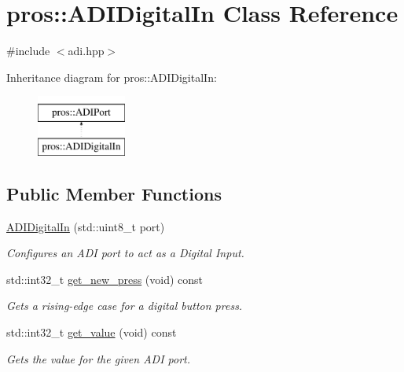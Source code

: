 \hypertarget{classpros_1_1ADIDigitalIn}{}\section{pros\+::A\+D\+I\+Digital\+In Class Reference}
\label{classpros_1_1ADIDigitalIn}


{\ttfamily \#include $<$adi.\+hpp$>$}

Inheritance diagram for pros\+::A\+D\+I\+Digital\+In\+:\begin{figure}[H]
\begin{center}
\leavevmode
\includegraphics[height=2.000000cm]{classpros_1_1ADIDigitalIn}
\end{center}
\end{figure}
\subsection*{Public Member Functions}
\begin{DoxyCompactItemize}
\item 
\mbox{\hyperlink{classpros_1_1ADIDigitalIn_a08fd8f876b569084bf375ef59116e4f7}{A\+D\+I\+Digital\+In}} (std\+::uint8\+\_\+t port)
\begin{DoxyCompactList}\small\item\em Configures an A\+DI port to act as a Digital Input. \end{DoxyCompactList}\item 
std\+::int32\+\_\+t \mbox{\hyperlink{classpros_1_1ADIDigitalIn_a27d82a95e717eeee61ed6555952a93d8}{get\+\_\+new\+\_\+press}} (void) const
\begin{DoxyCompactList}\small\item\em Gets a rising-\/edge case for a digital button press. \end{DoxyCompactList}\item 
std\+::int32\+\_\+t \mbox{\hyperlink{classpros_1_1ADIDigitalIn_ac79b5fd3ce67ae6ffc4b1fbbb306e997}{get\+\_\+value}} (void) const
\begin{DoxyCompactList}\small\item\em Gets the value for the given A\+DI port. \end{DoxyCompactList}\end{DoxyCompactItemize}


